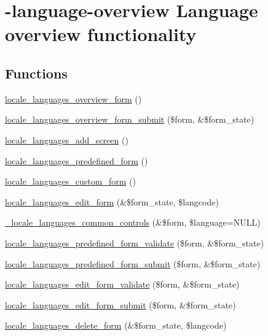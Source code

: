 \hypertarget{group__locale}{
\section{-language-overview Language overview functionality}
\label{group__locale}
}
\subsection*{Functions}
\begin{CompactItemize}
\item 
\hyperlink{group__locale_g6cdda3c5c776e4c263ace510317cdeed}{locale\_\-languages\_\-overview\_\-form} ()
\item 
\hyperlink{group__locale_g957be3bb6cd02af2ff2acd887fc2b3fe}{locale\_\-languages\_\-overview\_\-form\_\-submit} (\$form, \&\$form\_\-state)
\item 
\hyperlink{group__locale_g717959709d412fc1039f7436501dbf49}{locale\_\-languages\_\-add\_\-screen} ()
\item 
\hyperlink{group__locale_ga8a3a758f48d2d2e1e7746dbb6ece613}{locale\_\-languages\_\-predefined\_\-form} ()
\item 
\hyperlink{group__locale_g37f39352a275f470e0acce3157108b76}{locale\_\-languages\_\-custom\_\-form} ()
\item 
\hyperlink{group__locale_g7509cf7dde8125ba91c2f93d7a42ded1}{locale\_\-languages\_\-edit\_\-form} (\&\$form\_\-state, \$langcode)
\item 
\hyperlink{group__locale_ga662af294a8422d2b73e6e05288b1b8d}{\_\-locale\_\-languages\_\-common\_\-controls} (\&\$form, \$language=NULL)
\item 
\hyperlink{group__locale_g4298724abc57b7d2622a2c9642b4f742}{locale\_\-languages\_\-predefined\_\-form\_\-validate} (\$form, \&\$form\_\-state)
\item 
\hyperlink{group__locale_g83df19c32a63b094d033d0802d74d7cd}{locale\_\-languages\_\-predefined\_\-form\_\-submit} (\$form, \&\$form\_\-state)
\item 
\hyperlink{group__locale_g0d97a3815fcd49bb49ed59dc77ebb802}{locale\_\-languages\_\-edit\_\-form\_\-validate} (\$form, \&\$form\_\-state)
\item 
\hyperlink{group__locale_g749200a912dbb5d31c5403d3fd909741}{locale\_\-languages\_\-edit\_\-form\_\-submit} (\$form, \&\$form\_\-state)
\item 
\hyperlink{group__locale_ga207017c2a9b12c01b98bb40193d6acd}{locale\_\-languages\_\-delete\_\-form} (\&\$form\_\-state, \$langcode)

\end{CompactItemize}

